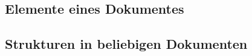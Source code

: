 
\newpage

\subsection{Elemente eines Dokumentes}





\subsection{Strukturen in beliebigen Dokumenten}



